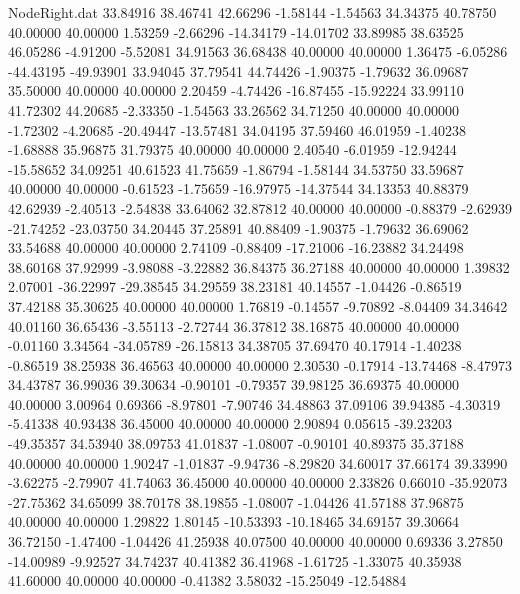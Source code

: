 \begin{filecontents}{NodeRight.dat}
  33.84916   38.46741   42.66296    -1.58144   -1.54563   34.34375   40.78750   40.00000   40.00000    1.53259   -2.66296  -14.34179  -14.01702
  33.89985   38.63525   46.05286    -4.91200   -5.52081   34.91563   36.68438   40.00000   40.00000    1.36475   -6.05286  -44.43195  -49.93901
  33.94045   37.79541   44.74426    -1.90375   -1.79632   36.09687   35.50000   40.00000   40.00000    2.20459   -4.74426  -16.87455  -15.92224
  33.99110   41.72302   44.20685    -2.33350   -1.54563   33.26562   34.71250   40.00000   40.00000   -1.72302   -4.20685  -20.49447  -13.57481
  34.04195   37.59460   46.01959    -1.40238   -1.68888   35.96875   31.79375   40.00000   40.00000    2.40540   -6.01959  -12.94244  -15.58652
  34.09251   40.61523   41.75659    -1.86794   -1.58144   34.53750   33.59687   40.00000   40.00000   -0.61523   -1.75659  -16.97975  -14.37544
  34.13353   40.88379   42.62939    -2.40513   -2.54838   33.64062   32.87812   40.00000   40.00000   -0.88379   -2.62939  -21.74252  -23.03750
  34.20445   37.25891   40.88409    -1.90375   -1.79632   36.69062   33.54688   40.00000   40.00000    2.74109   -0.88409  -17.21006  -16.23882
  34.24498   38.60168   37.92999    -3.98088   -3.22882   36.84375   36.27188   40.00000   40.00000    1.39832    2.07001  -36.22997  -29.38545
  34.29559   38.23181   40.14557    -1.04426   -0.86519   37.42188   35.30625   40.00000   40.00000    1.76819   -0.14557   -9.70892   -8.04409
  34.34642   40.01160   36.65436    -3.55113   -2.72744   36.37812   38.16875   40.00000   40.00000   -0.01160    3.34564  -34.05789  -26.15813
  34.38705   37.69470   40.17914    -1.40238   -0.86519   38.25938   36.46563   40.00000   40.00000    2.30530   -0.17914  -13.74468   -8.47973
  34.43787   36.99036   39.30634    -0.90101   -0.79357   39.98125   36.69375   40.00000   40.00000    3.00964    0.69366   -8.97801   -7.90746
  34.48863   37.09106   39.94385    -4.30319   -5.41338   40.93438   36.45000   40.00000   40.00000    2.90894    0.05615  -39.23203  -49.35357
  34.53940   38.09753   41.01837    -1.08007   -0.90101   40.89375   35.37188   40.00000   40.00000    1.90247   -1.01837   -9.94736   -8.29820
  34.60017   37.66174   39.33990    -3.62275   -2.79907   41.74063   36.45000   40.00000   40.00000    2.33826    0.66010  -35.92073  -27.75362
  34.65099   38.70178   38.19855    -1.08007   -1.04426   41.57188   37.96875   40.00000   40.00000    1.29822    1.80145  -10.53393  -10.18465
  34.69157   39.30664   36.72150    -1.47400   -1.04426   41.25938   40.07500   40.00000   40.00000    0.69336    3.27850  -14.00989   -9.92527
  34.74237   40.41382   36.41968    -1.61725   -1.33075   40.35938   41.60000   40.00000   40.00000   -0.41382    3.58032  -15.25049  -12.54884

\end{filecontents}
